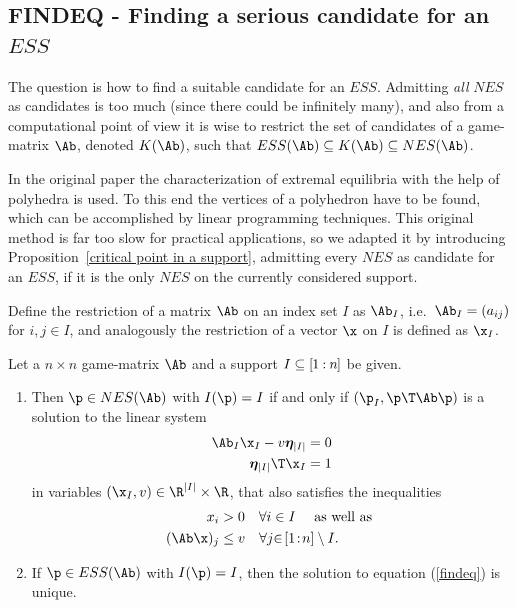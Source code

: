 \documentclass[moor]{informs3}              %
\def\irg#1#2{{ \in\! [{#1}\! : \! {#2}]}}
\def\rg#1#2{{ [\kern-.5pt{#1}\kern-.5pt : \kern-.5pt {#2}\kern-.5pt]}}
\begin{document}
\subsection*{FINDEQ - Finding a serious candidate for an $ESS$}
The question is how to find a suitable candidate for an $ESS$. Admitting \emph{all} $NES$ as candidates is too much (since there could be infinitely many), and also from a computational point of view it is wise to restrict the set of candidates of a game-matrix $\Ab$, denoted $K(\Ab)$, such that $ESS(\Ab)\subseteq K(\Ab) \subseteq NES(\Ab)$.

In the original paper \cite{Bomz92a} the characterization of extremal equilibria with the help of polyhedra is used. To this end the vertices of a polyhedron have to be found, which can be accomplished by linear programming techniques.
This original method is far too slow for  practical applications, so we adapted it by introducing Proposition~\ref{critical point in a support}, admitting every $NES$ as candidate for an $ESS$, if it is the only $NES$ on the currently considered support.

Define the restriction of a matrix $\Ab$ on an index set $I$ as $\Ab_I$, i.e.\ $\Ab_I=(a_{ij})$ for $i,j \in I$, and  analogously the restriction of a vector $\x$ on $I$ is defined as $\x_I$.

\begin{prop}
\label{critical point in a support}
Let a $n \times n$ game-matrix $\Ab$ and a support $I\subseteq\rg 1n$ be given.
\begin{enumerate}[label=(\alph*)]
\item
 Then $\p \in NES(\Ab)$ with $I(\p)=I$ if and only if $(\p_I,\p \T \Ab \p)$ is a solution to the linear system
\begin{equation}
\label{findeq}
\begin{split}
\Ab_I \x_I -v\bm{\eta}_{|I|}=0 \\
\bm{\eta}_{|I|}\T\x_I=1
\end{split}
\end{equation}
in variables $(\x_I,v)\in \R^{|I|}\times\R$, that also satisfies the inequalities
\begin{equation}
\begin{aligned}
\label{findeq2}
x_i&>0 \quad \forall i \in I \quad \mbox{ as well as } \\
(\Ab \x)_j &\leq v \quad \forall j \irg 1n \setminus I \mbox{.}
\end{aligned}\end{equation}
\item If $\p\in ESS(\Ab)$ with $I(\p)=I$, then the solution to equation (\ref{findeq}) is unique.
\end{enumerate}
\end{prop}
\end{document}
